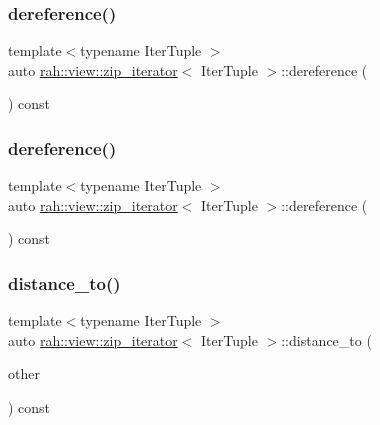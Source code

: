 \subsubsection{\texorpdfstring{dereference()}{dereference()}\hspace{0.1cm}{\footnotesize\ttfamily [1/2]}}
{\footnotesize\ttfamily template$<$typename Iter\+Tuple $>$ \\
auto \mbox{\hyperlink{structrah_1_1view_1_1zip__iterator}{rah\+::view\+::zip\+\_\+iterator}}$<$ Iter\+Tuple $>$\+::dereference (\begin{DoxyParamCaption}{ }\end{DoxyParamCaption}) const\hspace{0.3cm}{\ttfamily [inline]}}

\mbox{\label{structrah_1_1view_1_1zip__iterator_a775ecbdf57e02dd926e5b83f0a3bd8c1}} 
\subsubsection{\texorpdfstring{dereference()}{dereference()}\hspace{0.1cm}{\footnotesize\ttfamily [2/2]}}
{\footnotesize\ttfamily template$<$typename Iter\+Tuple $>$ \\
auto \mbox{\hyperlink{structrah_1_1view_1_1zip__iterator}{rah\+::view\+::zip\+\_\+iterator}}$<$ Iter\+Tuple $>$\+::dereference (\begin{DoxyParamCaption}{ }\end{DoxyParamCaption}) const\hspace{0.3cm}{\ttfamily [inline]}}

\mbox{\label{structrah_1_1view_1_1zip__iterator_a01c298bede994df318d47205c50cc461}} 
\subsubsection{\texorpdfstring{distance\_to()}{distance\_to()}\hspace{0.1cm}{\footnotesize\ttfamily [1/2]}}
{\footnotesize\ttfamily template$<$typename Iter\+Tuple $>$ \\
auto \mbox{\hyperlink{structrah_1_1view_1_1zip__iterator}{rah\+::view\+::zip\+\_\+iterator}}$<$ Iter\+Tuple $>$\+::distance\+\_\+to (\begin{DoxyParamCaption}\item[{\mbox{\hyperlink{structrah_1_1view_1_1zip__iterator}{zip\+\_\+iterator}}$<$ Iter\+Tuple $>$}]{other }\end{DoxyParamCaption}) const\hspace{0.3cm}{\ttfamily [inline]}}

